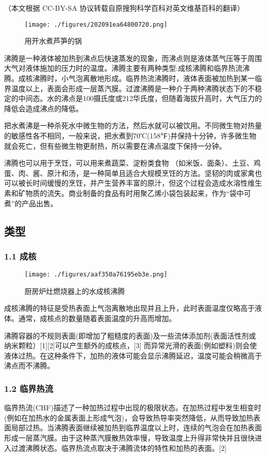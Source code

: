 
（本文根据 CC-BY-SA 协议转载自原搜狗科学百科对英文维基百科的翻译）

\begin{figure}[ht]
\centering
\texttt{[image: ./figures/202091ea64800720.png]}
\caption{用开水煮芦笋的锅} \label{fig_FT_5}
\end{figure}

沸腾是一种液体被加热到沸点后快速蒸发的现象，而沸点则是液体蒸气压等于周围大气对液体施加的压力时的温度。沸腾主要有两种类型:成核沸腾和临界热流沸腾。成核沸腾时，小气泡离散地形成。临界热流沸腾时，液体表面被加热到某一临界温度以上，表面会形成一层蒸汽膜。过渡沸腾是一种介于两种沸腾状态下的不稳定的中间态。水的沸点是100摄氏度或212华氏度，但随着海拔升高时，大气压力的降低会造成沸点的降低。

把水煮沸是一种杀死水中微生物的方法，然后水就可以被饮用。不同微生物对热量的敏感性各不相同，一般来说，把水煮到70℃(158℉)并保持十分钟，许多微生物就会死亡，但有些微生物更耐热，所以需要在沸点温度下保持一分钟。

沸腾也可以用于烹饪，可以用来煮蔬菜、淀粉类食物 （如米饭、面条）、土豆、鸡蛋、肉、酱、原汁和汤，是一种简单且适合大规模烹饪的方法。坚韧的肉或家禽也可以被长时间缓慢的烹饪，并产生营养丰富的原汁，但这个过程会造成水溶性维生素和矿物质的流失。商业制备的食品有时用聚乙烯小袋包装起来，作为“袋中可煮”的产品出售。

\subsection{类型}
\subsubsection{1.1 成核}
\begin{figure}[ht]
\centering
\texttt{[image: ./figures/aaf350a76195eb3e.png]}
\caption{厨房炉灶燃烧器上的水成核沸腾} \label{fig_FT_1}
\end{figure}

成核沸腾的特征是受热表面上气泡离散地出现并且上升，此时表面温度仅略高于液体。通常，成核点的数量随着表面温度的升高而增加。

沸腾容器的不规则表面(即增加了粗糙度的表面)及一些流体添加剂(表面活性剂或纳米颗粒）[1][2]可以产生额外的成核点，[3] 而异常光滑的表面(例如塑料)则会使液体过热。在这种条件下，加热的液体可能会显示沸腾延迟，温度可能会稍微高于沸点而不沸腾。

\subsubsection{1.2 临界热流}
临界热流(CHF)描述了一种加热过程中出现的极限状态。在加热过程中发生相变时(例如在加热水的金属表面上形成气泡)，会导致热导率突然降低，从而导致加热表面局部过热。当沸腾表面继续被加热到临界温度以上时，连续的气泡会在加热表面形成一层蒸汽膜。由于这种蒸汽膜散热效率慢，导致温度上升得非常快并且很快进入过渡沸腾状态。临界热流点取决于沸腾流体的特性和加热的表面。[2]

